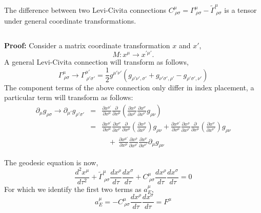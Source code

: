 \begin{tcolorbox}
The difference between two Levi-Civita connections $C^{\mu}_{\ \rho \sigma} = \Gamma^{\mu}_{\ \rho \sigma} - \tilde{\Gamma}^{\mu}_{\ \rho \sigma}$ is a tensor under general coordinate transformations. 

$ $

\textbf{Proof:}
Consider a matrix coordinate transformation $x$ and $x'$, $$ M: x^{\mu} \rightarrow x^{'\mu'}. $$ A general Levi-Civita connection will transform as follows,
\begin{equation}
    \Gamma^{\mu}_{\ \rho \sigma}\rightarrow \Gamma^{\mu'}_{\ \rho' \sigma'} = \frac{1}{2}g^{\mu'\nu'}\left(g_{\rho'\nu', \sigma'} + g_{\nu'\sigma',\rho'}-g_{\rho'\sigma', \nu'}\right)
\end{equation}
The component terms of the above connection only differ in index placement, a particular term will transform as follows:
\begin{eqnarray*}
    \partial_{\mu}g_{\rho\sigma} \rightarrow  \partial_{\mu'}g_{\rho'\sigma'} &=& \frac{\partial x^{\mu'}}{\partial x^{\mu}}\frac{\partial }{\partial x^{\mu}}\left(\frac{\partial x^{\rho}}{\partial x^{\rho'}}\frac{\partial x^{\nu}}{\partial x^{\nu'}}g_{\rho\nu}\right)\\
    &=& \frac{\partial x^{\mu'}}{\partial x^{\mu}}\frac{\partial x^{\nu}}{\partial x^{\nu'}}\frac{\partial }{\partial x^{\mu}}\left(\frac{\partial x^{\rho}}{\partial x^{\rho'}}\right)g_{\rho\nu} +
    \frac{\partial x^{\mu'}}{\partial x^{\mu}}\frac{\partial x^{\rho}}{\partial x^{\rho'}}\frac{\partial }{\partial x^{\mu}}\left(\frac{\partial x^{\nu}}{\partial x^{\nu'}}\right)g_{\rho\nu}  \\
    & & \ \ \ \ + \  \frac{\partial x^{\mu'}}{\partial x^{\mu}}\frac{\partial x^{\rho}}{\partial x^{\rho'}}\frac{\partial x^{\nu}}{\partial x^{\nu'}}\partial_{\mu}g_{\rho\nu} 
\end{eqnarray*}
\end{tcolorbox}
The geodesic equation is now,
\begin{equation}
    \frac{d^2x^{\mu}}{d\tau^2} + \tilde{\Gamma}^{\mu}_{\ \rho\sigma}\frac{dx^{\rho}}{d\tau}\frac{dx^{\sigma}}{d\tau} + C^{\mu}_{\ \rho\sigma}\frac{dx^{\rho}}{d\tau}\frac{dx^{\sigma}}{d\tau} =0
\end{equation}
For which we identify the first two terms as $a_{E}^{\mu}$,
\begin{equation}
    a_{E}^{\mu} = -C^{\mu}_{\ \rho\sigma}\frac{dx^{\rho}}{d\tau}\frac{dx^{\sigma}}{d\tau} = F^{\mu}
\end{equation}
